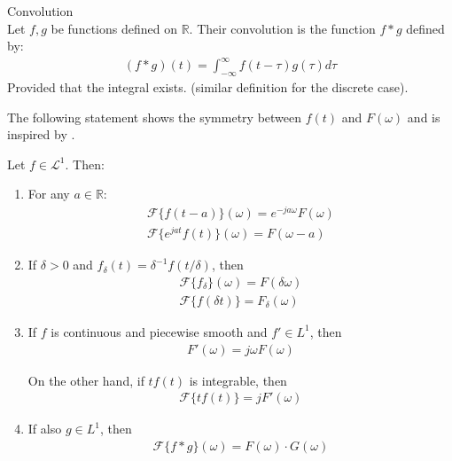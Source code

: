 \begin{definition}{Convolution}
\\
Let $f,g$ be functions defined on $\mathbb{R}$. Their convolution is the function $f*g$ defined by:
\begin{align*}
(f*g)(t) = \int_{-\infty}^\infty f(t-\tau) g(\tau) d\tau
\end{align*}
Provided that the integral exists.
(similar definition for the discrete case).
\end{definition}

\noindent
The following statement shows the symmetry between $f(t)$ and $F(\omega)$ and is inspired by \cite{FAA}.

\begin{theorem}
Let $f \in \mathcal{L}^1$. Then:

\begin{enumerate}[label=(\alph*)]
\item For any $a \in \mathbb{R}$:
\begin{align*}
\mathcal{F}\{f(t-a)\}(\omega) = e^{-ja\omega} F(\omega) \\
\mathcal{F}\{e^{jat}f(t)\}(\omega) = F(\omega - a)
\end{align*}

\item If $\delta > 0$ and $f_\delta(t)=\delta^{-1}f(t/\delta)$, then
\begin{align*}
\mathcal{F}\{f_\delta\}(\omega) = F(\delta\omega) \\
\mathcal{F}\{f(\delta t)\} = F_\delta(\omega)
\end{align*}

\item If $f$ is continuous and piecewise smooth and $f' \in L^1$, then
\begin{align*}
F'(\omega) = j\omega F(\omega)
\end{align*}

On the other hand, if $tf(t)$ is integrable, then
\begin{align*}
\mathcal{F}\{tf(t)\} = j F'(\omega)
\end{align*}

\item If also $g \in L^1$, then
\begin{align*}
\mathcal{F}\{f*g\}(\omega) = F(\omega) \cdot G(\omega)
\end{align*}
\end{enumerate}
\end{theorem}


